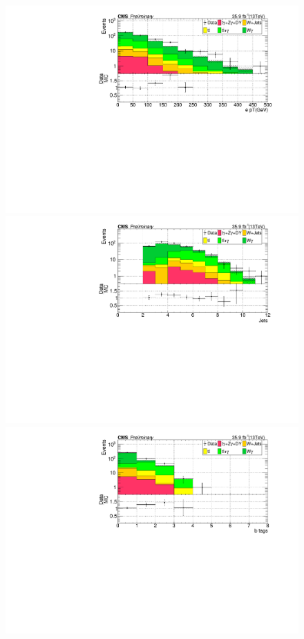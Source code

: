 \begin{figure}[h!]
\includegraphics[width=0.48\linewidth]{../Figures/Chap3/lost_lepton/ElePt.pdf}\\
\includegraphics[width=0.48\linewidth]{../Figures/Chap3/lost_lepton/nHadJets_Ele1.pdf}
\includegraphics[width=0.48\linewidth]{../Figures/Chap3/lost_lepton/nBTags_Ele1.pdf}
\end{figure}


